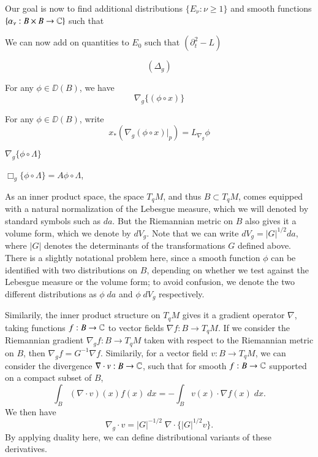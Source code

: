 Our goal is now to find additional distributions $\{ E_\nu : \nu \geq 1 \}$ and smooth functions $\{ \alpha_\nu: B \times B \to \operatorname{\mathbb{C}} \}$ such that
%
\[  \]

We can now add on quantities to $E_0$ such that $(\partial_t^2 - L)$



%
\[ ( \Delta_g ) \]

For any $\phi \in \DD(B)$, we have
%
\[ \nabla_g \{ (\phi \circ x) \} \]

For any $\phi \in \DD(B)$, write
%
\[ x_*(\nabla_g (\phi \circ x)|_p ) = L_{\nabla_g} \phi \]

$\nabla_g \{ \phi \circ \Lambda \}$

$\Box_g \{ \phi \circ \Lambda \} = A \phi \circ \Lambda$, 


As an inner product space, the space $T_q M$, and thus $B \subset T_q M$, comes equipped with a natural normalization of the Lebesgue measure, which we will denoted by standard symbols such as $da$. But the Riemannian metric on $B$ also gives it a volume form, which we denote by $dV_g$. Note that we can write $dV_g = |G|^{1/2} da$, where $|G|$ denotes the determinants of the transformations $G$ defined above. There is a slightly notational problem here, since a smooth function $\phi$ can be identified with two distributions on $B$, depending on whether we test against the Lebesgue measure or the volume form; to avoid confusion, we denote the two different distributions as $\phi\; da$ and $\phi\; dV_g$ respectively.

Similarily, the inner product structure on $T_q M$ gives it a gradient operator $\nabla$, taking functions $f: B \to \operatorname{\mathbb{C}}$ to vector fields $\nabla f: B \to T_q M$. If we consider the Riemannian gradient $\nabla_g f: B \to T_q M$ taken with respect to the Riemannian metric on $B$, then $\nabla_g f = G^{-1} \nabla f$. Similarily, for a vector field $v: B \to T_q M$, we can consider the divergence $\nabla \cdot v: B \to \operatorname{\mathbb{C}}$, such that for smooth $f: B \to \operatorname{\mathbb{C}}$ supported on a compact subset of $B$,
%
\[ \int_B (\nabla \cdot v)(x) f(x)\; dx = - \int_B v(x) \cdot \nabla f(x)\; dx. \]
%
We then have
%
\[ \nabla_g \cdot v = |G|^{-1/2}\; \nabla \cdot \{ |G|^{1/2} v \}. \]
%
By applying duality here, we can define distributional variants of these derivatives.


